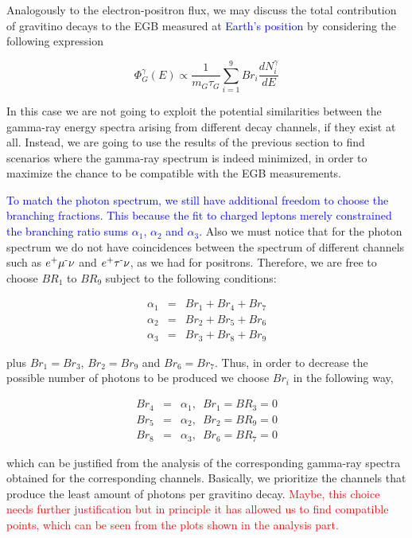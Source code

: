 \documentclass[a4paper,11pt]{article}
\newcommand*{\blue}{\textcolor{blue}}
\newcommand*{\red}{\textcolor{red}}
\begin{document}
Analogously to the electron-positron flux, we may discuss the total contribution of gravitino decays to the EGB measured at \blue{Earth's position} by considering the following expression

\begin{equation}
\Phi_{G}^{\gamma}(E) \propto\frac{1}{m_{G}\tau_{G}}\sum_{i=1}^{9}Br_{i}\frac{dN^{\gamma}_{i}}{dE}
\end{equation}

In this case we are not going to exploit the potential similarities between the gamma-ray energy spectra arising from different decay channels, if they exist at all. Instead, we are going to use the results of the previous section to find scenarios where the gamma-ray spectrum is indeed minimized, in order to maximize the chance to be compatible with the EGB measurements.

\blue{To match the photon spectrum, we still have additional freedom to choose the branching fractions. This because the fit to charged leptons merely constrained the branching ratio sums $\alpha_1$, $\alpha_2$ and $\alpha_3$.} Also we must notice that for the photon spectrum we do not have coincidences
between the spectrum of different channels such as $e\text{\textsuperscript{+}}\mu\text{\textsuperscript{-}}\nu$
and $e\text{\textsuperscript{+}}\tau\text{\textsuperscript{-}}\nu$,
as we had for positrons. Therefore, we are free to choose $BR_{1}$
to $BR_{9}$ subject to the following conditions:

\begin{eqnarray*}
\alpha_{1} & = & Br_{1}+Br_{4}+Br_{7}\\
\alpha_{2} & = & Br_{2}+Br_{5}+Br_{6}\\
\alpha_{3} & = & Br_{3}+Br_{8}+Br_{9}
\end{eqnarray*}

\noindent plus $Br_1 = Br_3$, $Br_2 = Br_9$ and $Br_6 = Br_7$. Thus, in order to decrease the possible number of photons to be produced we choose $Br_{i}$ in the following way,

\begin{eqnarray*}
Br_{4} & = & \alpha_{1},\,\,\,Br_{1}=BR_{3}=0\\
Br_{5} & = & \alpha_{2},\,\,\,Br_{2}=BR_{9}=0\\
Br_{8} & = & \alpha_{3},\,\,\,Br_{6}=BR_{7}=0
\end{eqnarray*}

\noindent which can be justified from the analysis of the corresponding gamma-ray spectra obtained for the corresponding channels. Basically,
we prioritize the channels that produce the least amount of photons per gravitino decay. \red{Maybe, this choice needs further justification but in principle it has allowed us to find compatible points, which can be seen from the plots shown in the analysis part.} 
\end{document}
